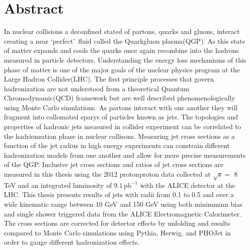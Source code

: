 \chapter*{Abstract}\label{ch:abstract}
In nuclear collisions a deconfined stated of partons, quarks and gluons, interact creating a near \lq perfect\rq \, fluid called the Quark\textendash gluon plasma(QGP).  As this state of matter expands and cools the quarks once again recombine into the hadrons measured in particle detectors.  Understanding the energy loss mechanisms of this phase of matter is one of the major goals of the nuclear physics program at the Large Hadron Collider(LHC).  The first principle processes that govern hadronization are not understood from a theoretical Quantum Chromodynamic(QCD) framework but are well described phenomenologically using Monte Carlo simulations.  
As partons interact with one another they will fragment into collomated sparys of particles known as jets.  The topologies and properties of hadronic jets measured in collider experiment can be correlated to the hadrionzation phase in nuclear collisons.   Measuring  jet cross sections as a function of the jet radius in high energy experiments can constrain different hadronization models from one another and allow for more precise measurements of the QGP.
Inclusive jet cross sections and ratios of jet cross sections are measured in this thesis using the 2012 proton\textendash proton data collected at $ \sqrt{ \mathrm{s} } = $ 8 TeV and an integrated luminosity of $ 9.1 \,\mathrm{pb^{-1}} $  with the ALICE detector at the LHC.  This thesis presents results of jets with radii from 0.1 to 0.5 and over a wide kinematic range between 10 GeV and 150 GeV using both minimmum bias and single shower triggered data from the ALICE Electromagnetic Calorimeter.  The cross sections are corrected for detector effects by unfolding and results compared to Monte Carlo simulations using Pythia, Herwig, and PHOJet in order to gauge different hadronization effects.